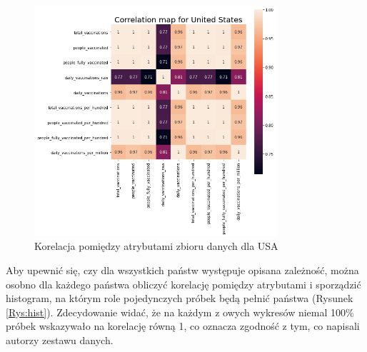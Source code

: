 \documentclass[12pt, oneside, openany]{article}
\begin{document}
\begin{figure}[h]
\centering
\includegraphics[width=0.8\textwidth]{../img/usa_corr.png} 
\caption{Korelacja pomiędzy atrybutami zbioru danych dla USA}
\label{Rys:usa}
\end{figure}

Aby upewnić się, czy dla wszystkich państw występuje opisana zależność, można osobno dla każdego państwa obliczyć korelację pomiędzy atrybutami i sporządzić histogram, na którym role pojedynczych próbek będą pełnić państwa (Rysunek \ref{Rys:hist}). Zdecydowanie widać, że na każdym z owych wykresów niemal 100\% próbek wskazywało na korelację równą 1, co oznacza zgodność z tym, co napisali autorzy zestawu danych.
\end{document}
